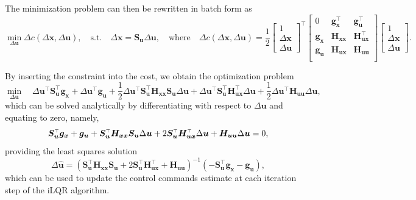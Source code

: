 \documentclass[10pt,a4paper]{article} %
\newcommand{\trsp}{{\scriptscriptstyle\top}}
\begin{document}
The minimization problem can then be rewritten in batch form as 
\begin{equation}
	\min_{\Delta\bm{u}} \Delta c(\Delta\bm{x},\Delta\bm{u}), \quad\text{s.t.}\quad \Delta\bm{x} = \bm{S}_{\bm{u}} \Delta\bm{u}, 
	\quad\text{where}\quad
	\Delta c(\Delta\bm{x},\Delta\bm{u}) = 
	\frac{1}{2}
	\begin{bmatrix}
	1 \\ \Delta\bm{x} \\ \Delta\bm{u}
	\end{bmatrix}^{\!\trsp}
	\begin{bmatrix}
	0 & \bm{g}_{\bm{x}}^\trsp & \bm{g}_{\bm{u}}^\trsp \\
	\bm{g}_{\bm{x}} & \bm{H}_{\bm{x}\bm{x}} & \bm{H}_{\bm{u}\bm{x}}^\trsp \\
	\bm{g}_{\bm{u}} & \bm{H}_{\bm{u}\bm{x}} & \bm{H}_{\bm{u}\bm{u}} \\
	\end{bmatrix}
	\begin{bmatrix}
	1 \\ \Delta\bm{x} \\ \Delta\bm{u}
	\end{bmatrix}.
	\label{eq:dc_batch}
\end{equation} 

By inserting the constraint into the cost, we obtain the optimization problem
\begin{equation}
	\min_{\Delta\bm{u}} \quad
	\Delta\bm{u}^\trsp \bm{S}_{\bm{u}}^\trsp \bm{g}_{\bm{x}} + \Delta\bm{u}^\trsp \bm{g}_{\bm{u}} +
	\frac{1}{2} \Delta\bm{u}^\trsp \bm{S}_{\bm{u}}^\trsp \bm{H}_{\bm{x}\bm{x}} \bm{S}_{\bm{u}} \Delta\bm{u} +
	\Delta\bm{u}^\trsp \bm{S}_{\bm{u}}^\trsp \bm{H}_{\bm{u}\bm{x}}^\trsp \Delta\bm{u} +
	\frac{1}{2} \Delta\bm{u}^\trsp \bm{H}_{\bm{u}\bm{u}} \Delta\bm{u},
	\label{eq:minu}
\end{equation}
which can be solved analytically by differentiating with respect to $\Delta\bm{u}$ and equating to zero, namely,
\begin{equation}
	\bm{S}_{\bm{u}}^\trsp \bm{g}_{\bm{x}} + \bm{g}_{\bm{u}} +\\
	\bm{S}_{\bm{u}}^\trsp \bm{H}_{\bm{x}\bm{x}} \bm{S}_{\bm{u}} \Delta\bm{u} + 
	2 \bm{S}_{\bm{u}}^\trsp \bm{H}_{\bm{u}\bm{x}}^\trsp \Delta\bm{u} +
	\bm{H}_{\bm{u}\bm{u}} \Delta\bm{u} = 0,
\end{equation}
providing the least squares solution
\begin{equation}
	\Delta\bm{\hat{u}} =
	{\left( \bm{S}_{\bm{u}}^\trsp \bm{H}_{\bm{x}\bm{x}} \bm{S}_{\bm{u}} + 2 \bm{S}_{\bm{u}}^\trsp \bm{H}_{\bm{u}\bm{x}}^\trsp + \bm{H}_{\bm{u}\bm{u}} \right)}^{-1}
	\left(-\bm{S}_{\bm{u}}^\trsp \bm{g}_{\bm{x}} - \bm{g}_{\bm{u}}\right),
	\label{eq:du_general}
\end{equation}
which can be used to update the control commands estimate at each iteration step of the iLQR algorithm.
\end{document}
